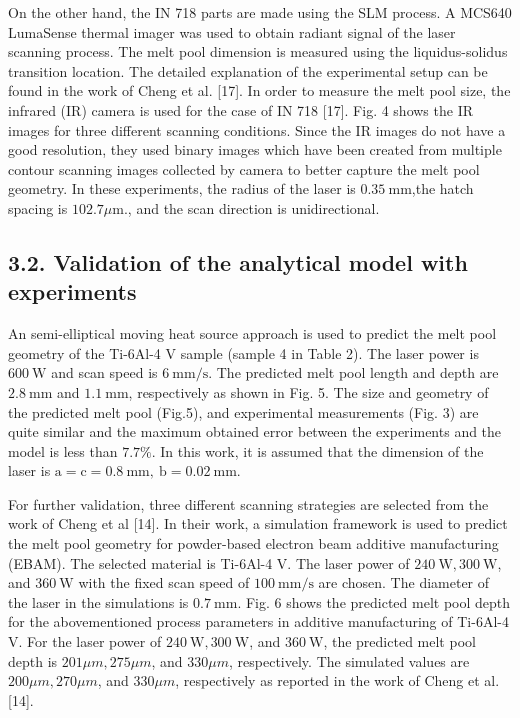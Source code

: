 \documentclass[10pt]{article}
\begin{document}
On the other hand, the IN 718 parts are made using the SLM process. A MCS640 LumaSense thermal imager was used to obtain radiant signal of the laser scanning process. The melt pool dimension is measured using the liquidus-solidus transition location. The detailed explanation of the experimental setup can be found in the work of Cheng et al. [17]. In order to measure the melt pool size, the infrared (IR) camera is used for the case of IN 718 [17]. Fig. 4 shows the IR images for three different scanning conditions. Since the IR images do not have a good resolution, they used binary images which have been created from multiple contour scanning images collected by camera to better capture the melt pool geometry. In these experiments, the radius of the laser is $0.35 \mathrm{~mm}$,the hatch spacing is $102.7 \mu \mathrm{m}$., and the scan direction is unidirectional.

\subsection*{3.2. Validation of the analytical model with experiments}
An semi-elliptical moving heat source approach is used to predict the melt pool geometry of the Ti-6Al-4 V sample (sample 4 in Table 2). The laser power is $600 \mathrm{~W}$ and scan speed is $6 \mathrm{~mm} / \mathrm{s}$. The predicted melt pool length and depth are $2.8 \mathrm{~mm}$ and $1.1 \mathrm{~mm}$, respectively as shown in Fig. 5. The size and geometry of the predicted melt pool (Fig.5), and experimental measurements (Fig. 3) are quite similar and the maximum obtained error between the experiments and the model is less than $7.7 \%$. In this work, it is assumed that the dimension of the laser is $\mathrm{a}=\mathrm{c}=0.8 \mathrm{~mm}, \mathrm{~b}=0.02 \mathrm{~mm}$.

For further validation, three different scanning strategies are selected from the work of Cheng et al [14]. In their work, a simulation framework is used to predict the melt pool geometry for powder-based electron beam additive manufacturing (EBAM). The selected material is Ti-6Al-4 V. The laser power of $240 \mathrm{~W}, 300 \mathrm{~W}$, and $360 \mathrm{~W}$ with the fixed scan speed of $100 \mathrm{~mm} / \mathrm{s}$ are chosen. The diameter of the laser in the simulations is $0.7 \mathrm{~mm}$. Fig. 6 shows the predicted melt pool depth for the abovementioned process parameters in additive manufacturing of Ti-6Al-4 V. For the laser power of $240 \mathrm{~W}, 300 \mathrm{~W}$, and $360 \mathrm{~W}$, the predicted melt pool depth is $201 \mu m, 275 \mu m$, and $330 \mu m$, respectively. The simulated values are $200 \mu m, 270 \mu m$, and $330 \mu m$, respectively as reported in the work of Cheng et al. [14].
\end{document}
